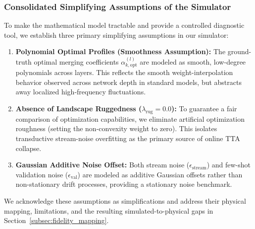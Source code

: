 \subsubsection{Consolidated Simplifying Assumptions of the Simulator}
To make the mathematical model tractable and provide a controlled diagnostic tool, we establish three primary simplifying assumptions in our simulator:
\begin{enumerate}
    \item \textbf{Polynomial Optimal Profiles (Smoothness Assumption):} The ground-truth optimal merging coefficients $\alpha_{k, \text{opt}}^{(l)}$ are modeled as smooth, low-degree polynomials across layers.
This reflects the smooth weight-interpolation behavior observed across network depth in standard models, but abstracts away localized high-frequency fluctuations.
    \item \textbf{Absence of Landscape Ruggedness ($\lambda_{\text{rug}} = 0.0$):} To guarantee a fair comparison of optimization capabilities, we eliminate artificial optimization roughness (setting the non-convexity weight to zero).
This isolates transductive stream-noise overfitting as the primary source of online TTA collapse.
    \item \textbf{Gaussian Additive Noise Offset:} Both stream noise ($\epsilon_{\text{stream}}$) and few-shot validation noise ($\epsilon_{\text{val}}$) are modeled as additive Gaussian offsets rather than non-stationary drift processes, providing a stationary noise benchmark.
\end{enumerate}
We acknowledge these assumptions as simplifications and address their physical mapping, limitations, and the resulting simulated-to-physical gaps in Section~\ref{subsec:fidelity_mapping}.

